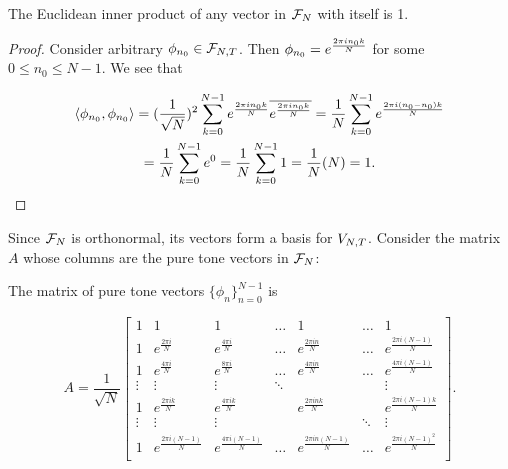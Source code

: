 \newpage

\begin{lemma}
    The Euclidean inner product of any vector in $\mathcal{F}_N$ with itself is 1.\\
    
    \begin{proof}
        Consider arbitrary $\phi_{n_0} \in \mathcal{F}_{N,T}$. Then $\phi_{n_0} = e^{\frac{2 \pi i n_0k}{N}}$ for some $0 \le n_0 \le N-1$. We see that 
        
        \begin{multline*}
            \langle \phi_{n_0},\phi_{n_0} \rangle = (\frac{1}{\sqrt{N}})^2 \sum_{k=0}^{N-1} e^{\frac{2 \pi i n_0k}{N}}\overline{e^{\frac{2 \pi i n_0k}{N}}} = \frac{1}{N} \sum_{k=0}^{N-1} e^{\frac{2 \pi i (n_0-n_0)k}{N}}\\
            = \frac{1}{N} \sum_{k=0}^{N-1} e^{0} = \frac{1}{N} \sum_{k=0}^{N-1} 1 = \frac{1}{N}(N) = 1.
        \end{multline*}
    \end{proof}
    
    \label{lem:FN_is_normal}
\end{lemma}

\par Since $\mathcal{F}_N$ is orthonormal, its vectors form a basis for $V_{N,T}$. Consider the matrix $A$ whose columns are the pure tone vectors in $\mathcal{F}_N$:

\begin{example}
    The matrix of pure tone vectors $\{\phi_n\}_{n=0}^{N-1}$ is
    
    $$A = \frac{1}{\sqrt{N}} \begin{bmatrix}
        1 & 1 & 1 & \hdots & 1 & \hdots & 1\\
        1 & e^{\frac{2\pi i}{N}} & e^{\frac{4\pi i}{N}} & \hdots & e^{\frac{2\pi in}{N}} & \hdots & e^{\frac{2\pi i(N-1)}{N}}\\
        1 & e^{\frac{4\pi i}{N}} & e^{\frac{8\pi i}{N}} & \hdots & e^{\frac{4\pi in}{N}} & \hdots & e^{\frac{4\pi i(N-1)}{N}}\\
        \vdots & \vdots & \vdots & \ddots & & & \vdots\\
        1 & e^{\frac{2\pi ik}{N}} & e^{\frac{4\pi ik}{N}} & & e^{\frac{2\pi ink}{N}} & & e^{\frac{2\pi i(N-1)k}{N}}\\
        \vdots & \vdots & \vdots & & & \ddots & \vdots\\
        1 & e^{\frac{2\pi i(N-1)}{N}} & e^{\frac{4\pi i(N-1)}{N}} & \hdots & e^{\frac{2\pi in(N-1)}{N}} & \hdots & e^{\frac{2\pi i(N-1)^2}{N}}\\
    \end{bmatrix}.$$
    \label{ex:invF_N}
\end{example}

